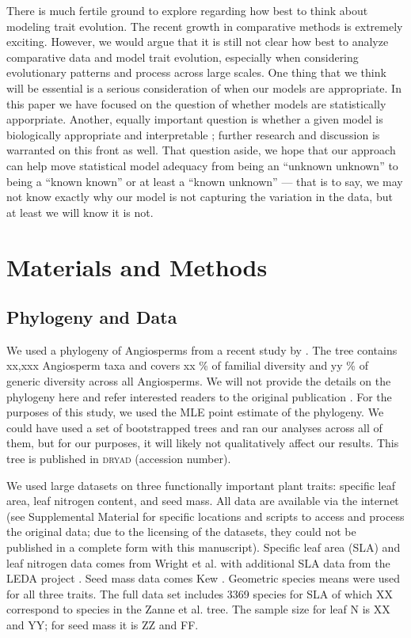 \documentclass[a4paper,12pt]{article}
\begin{document}
There is much fertile ground to explore regarding how best to think about modeling trait evolution. The recent growth in comparative methods is extremely exciting. However, we would argue that it is still not clear how best to analyze comparative data and model trait evolution, especially when considering evolutionary patterns and process across large scales. One thing that we think will be essential is a serious consideration of when our models are appropriate. In this paper we have focused on the question of whether models are statistically apporpriate. Another, equally important question is whether a given model is biologically appropriate and interpretable \citep{Hansen2012}; further research and discussion is warranted on this front as well. That question aside, we hope that our approach can help move statistical model adequacy from being an ``unknown unknown''  to being a ``known known'' or at least a ``known unknown'' --- that is to say, we may not know exactly why our model is not capturing the variation in the data, but at least we will know it is not.

\section{Materials and Methods}

\subsection{Phylogeny and Data}
 We used a phylogeny of Angiosperms from a recent study by \citet{Zanne2013}. The tree contains xx,xxx Angiosperm taxa and covers xx \% of familial diversity and yy \% of generic diversity across all Angiosperms. We will not provide the details on the phylogeny here and refer interested readers to the original publication \citep{Zanne2013}. For the purposes of this study, we used the MLE point estimate of the phylogeny. We could have used a set of bootstrapped trees and ran our analyses across all of them, but for our purposes, it will likely not qualitatively affect our results. This tree is published in \textsc{dryad} (accession number).

We used large datasets on three functionally important plant traits: specific leaf area, leaf nitrogen content, and seed mass.  All data are available via the internet (see Supplemental Material for specific locations and scripts to access and process the original data; due to the licensing of the datasets, they could not be published in a complete form with this manuscript). Specific leaf area (SLA) and leaf nitrogen data comes from Wright et al. \citep{Wright2004} with additional SLA data from the LEDA project \citep{Kleyer2008}.   Seed mass data comes Kew \citep{Kew2008}.  Geometric species means were used for all three traits.  The full data set includes 3369 species for SLA of which XX correspond to species in the Zanne et al. \citep{Zanne2013} tree.  The sample size for leaf N is XX and YY; for seed mass it is ZZ and FF.  
\end{document}

